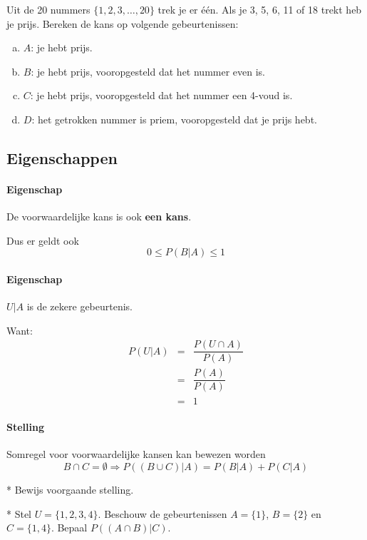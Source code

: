 \documentclass[12pt,twoside]{article}
\begin{document}
\begin{oefening}
Uit de 20 nummers $\{1,2,3,\ldots,20\}$ trek je er één. Als je 3, 5, 6, 11 of 18 trekt heb je
prijs. Bereken de kans op volgende gebeurtenissen:
\begin{enumerate}[(a)]
  \item $A$: je hebt prijs.
  \item $B$: je hebt prijs, vooropgesteld dat het nummer even is.
  \item $C$: je hebt prijs, vooropgesteld dat het nummer een 4-voud is.
  \item $D$: het getrokken nummer is priem, vooropgesteld dat je prijs hebt.
\end{enumerate}
\end{oefening}

\subsection{Eigenschappen}

\paragraph*{Eigenschap} De voorwaardelijke kans is ook {\bf een kans}.

Dus er geldt ook
$$0\leq P(B|A)\leq 1$$

\paragraph*{Eigenschap} $U|A$ is de zekere gebeurtenis.

Want:
\begin{eqnarray*}
  P(U|A) &=& \dfrac{P(U\cap A)}{P(A)}\\
         &=& \dfrac{P(A)}{P(A)}\\
         &=& 1
\end{eqnarray*}

\paragraph*{Stelling} Somregel voor voorwaardelijke kansen kan bewezen worden
$$B\cap C=\emptyset \Rightarrow P((B\cup C)|A)=P(B|A)+P(C|A)$$

\begin{oefening}*
Bewijs voorgaande stelling.
\end{oefening}

\begin{oefening}*
Stel $U=\{1,2,3,4\}$. Beschouw de gebeurtenissen $A=\{1\}$, $B=\{2\}$ en $C=\{1,4\}$. Bepaal $P((A\cap B)|C)$.
\end{oefening}
\end{document}
